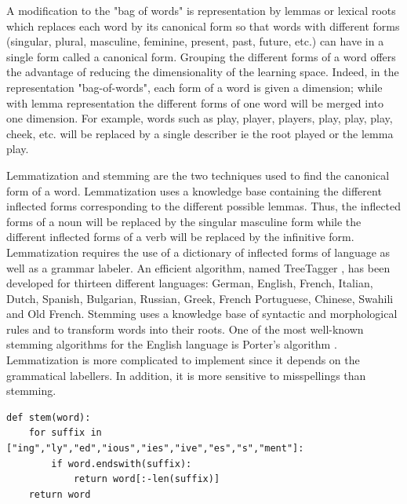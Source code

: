 
A modification to the "bag of words" is representation by lemmas or lexical roots which replaces  each word by its canonical form so that words with different
forms (singular, plural, masculine, feminine, present, past,
future, etc.) can have in a single form called a canonical form.
Grouping the different forms of a word offers the advantage of  reducing the dimensionality of the learning space. Indeed, in the representation "bag-of-words", each form of a word is given a dimension; while with lemma representation the different forms of one word will be merged into one dimension. For example, words such as play, player, players, play, play, play, cheek, etc. will be replaced by a single describer ie the root played or the lemma play.


Lemmatization and stemming are the two techniques used to find the canonical form of a word. Lemmatization uses a knowledge base containing the different inflected forms corresponding to the different possible lemmas. Thus, the inflected forms of a noun will be replaced by the singular masculine form while the different inflected forms of a verb will be replaced by the infinitive form. Lemmatization requires the use of a dictionary of inflected forms of language as well as a grammar labeler. An efficient algorithm, named TreeTagger \cite{schmid1994probabilistic}, has been developed for thirteen different languages: German, English, French, Italian, Dutch, Spanish, Bulgarian, Russian, Greek, French Portuguese, Chinese, Swahili and Old French. Stemming uses a knowledge base of syntactic and morphological rules and to transform words into their roots. One of the most well-known stemming algorithms for the English language is Porter's algorithm \citep{porter1980algorithm}. Lemmatization is more complicated to implement since it depends on the grammatical labellers. In addition, it is more sensitive to misspellings than stemming.

\begin{lstlisting}
def stem(word):
    for suffix in ["ing","ly","ed","ious","ies","ive","es","s","ment"]:
        if word.endswith(suffix):
            return word[:-len(suffix)]
    return word
\end{lstlisting}


